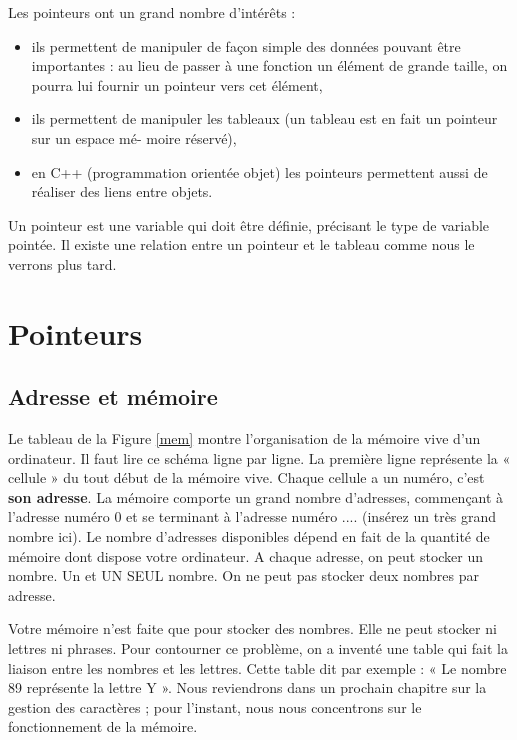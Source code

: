 \documentclass[a4paper, oneside,11pt]{book}
\begin{document}
Les pointeurs ont un grand nombre d'int\'er\^ets :

\begin{itemize}
\item ils permettent de manipuler de façon simple des donn\'ees pouvant \^etre importantes : au lieu de
passer \`a une fonction un \'el\'ement de grande taille, on pourra lui fournir un pointeur vers cet
\'el\'ement,
\item ils permettent de manipuler les tableaux (un tableau est en fait un pointeur sur un espace m\'e-
moire r\'eserv\'e),
\item en C++ (programmation orient\'ee objet) les pointeurs permettent aussi de r\'ealiser des liens entre
objets.
\end{itemize}

Un pointeur est une variable qui doit \^etre d\'efinie, pr\'ecisant le type de variable point\'ee. Il existe une relation entre un pointeur et le tableau comme nous le verrons plus tard.




\section{Pointeurs}

\subsection{Adresse et m\'emoire}

Le tableau de la Figure \ref{mem} montre l'organisation de la m\'emoire vive d'un ordinateur. Il faut lire ce sch\'ema ligne par ligne. La premi\`ere ligne repr\'esente la 
« cellule »  du tout d\'ebut de la m\'emoire vive. Chaque cellule a un num\'ero, c'est \textbf{son adresse}. La m\'emoire comporte un grand nombre d'adresses, commençant \`a l'adresse num\'ero 
0 et se terminant \`a l'adresse num\'ero .... (ins\'erez un tr\`es grand nombre ici). Le nombre d'adresses disponibles d\'epend en fait de la quantit\'e de m\'emoire dont dispose 
votre ordinateur. A chaque adresse, on peut stocker un nombre. Un et UN SEUL nombre. On ne peut pas stocker deux nombres par adresse.


Votre m\'emoire n'est faite que pour stocker des nombres. Elle ne peut stocker ni lettres ni phrases. Pour contourner ce probl\`eme, on a invent\'e une table qui fait la 
liaison entre les nombres et les lettres. Cette table dit par exemple : « Le nombre 89 repr\'esente la lettre Y ». Nous reviendrons dans un prochain chapitre sur la gestion 
des caract\`eres ; pour l'instant, nous nous concentrons sur le fonctionnement de la m\'emoire.
\end{document}
